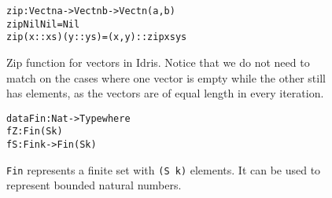 \begin{figure}
\label{fig:zip}
\begin{alltt}
zip : Vect n a -> Vect n b -> Vect n (a, b)
zip Nil       Nil       = Nil
zip (x :: xs) (y :: ys) = (x, y) :: zip xs ys
\end{alltt}
\caption{Zip function for vectors in Idris. Notice that we do not need to match on the cases where one vector is empty while the other still has elements, as the vectors are of equal length in every iteration.}
\end{figure}

\begin{figure}
\label{fig:fin}
\begin{alltt}
data Fin : Nat -> Type where
  fZ : Fin (S k)
  fS : Fin k -> Fin (S k)
\end{alltt}
\caption{\texttt{Fin} represents a finite set with \texttt{(S k)} elements. It can be used to represent bounded natural numbers.}
\end{figure}
